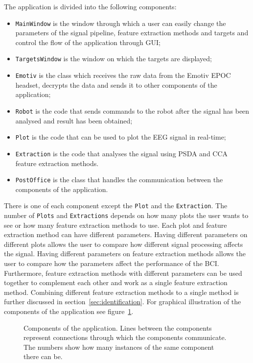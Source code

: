 The application is divided into the following components:
\begin{itemize}
	\item\texttt{MainWindow} is the window through which a user can easily change the parameters of the signal pipeline, \gls{feature extraction} methods and \glspl{target} and control the flow of the application through \gls{GUI};
	\item\texttt{TargetsWindow} is the window on which the \glspl{target} are displayed;
	\item\texttt{Emotiv} is the class which receives the raw data from the Emotiv EPOC headset, decrypts the data and sends it to other components of the application;
	\item\texttt{Robot} is the code that sends commands to the robot after the signal has been analysed and result has been obtained;
	\item\texttt{Plot} is the code that can be used to plot the \gls{EEG} signal in real-time;
	\item\texttt{Extraction} is the code that analyses the signal using \gls{PSDA} and \gls{CCA} \gls{feature extraction} methods.
	\item\texttt{PostOffice} is the class that handles the communication between the components of the application.
\end{itemize}
There is one of each component except the \texttt{Plot} and the \texttt{Extraction}. The number of \texttt{Plots} and \texttt{Extractions} depends on how many plots the user wants to see or how many \gls{feature extraction} methods to use. Each plot and \gls{feature extraction} method can have different parameters. Having different parameters on different plots allows the user to compare how different signal processing affects the signal. Having different parameters on \gls{feature extraction} methods allows the user to compare how the parameters affect the performance of the \gls{BCI}. Furthermore, \gls{feature extraction} methods with different parameters can be used together to complement each other and work as a single \gls{feature extraction} method. Combining different \gls{feature extraction} methods to a single method is further discussed in section~\ref{sec:identification}. For graphical illustration of the components of the application see figure~\ref{fig:class_diagram}.

\begin{figure}[h!]
	\centering
	
	\caption{Components of the application. Lines between the components represent connections through which the components communicate. The numbers show how many instances of the same component there can be.}
	\label{fig:class_diagram}
\end{figure}

